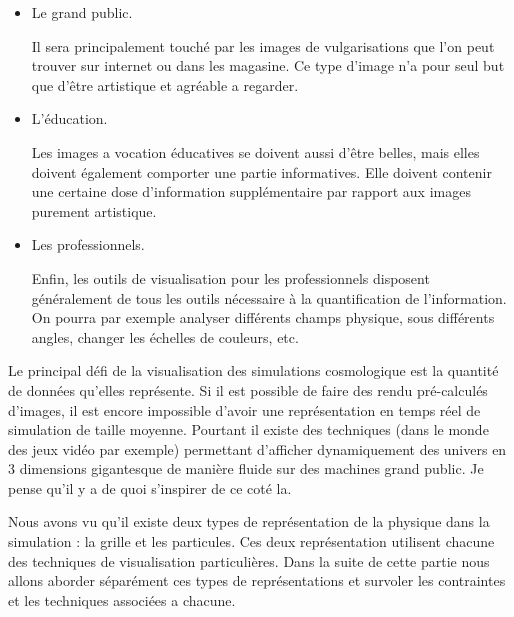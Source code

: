 \begin{itemize}
\item Le grand public. 
 
Il sera principalement touché par les images de vulgarisations que l'on peut trouver sur internet ou dans les magasine.
Ce type d'image n'a pour seul but que d'être artistique et agréable a regarder.

\item L'éducation.

Les images a vocation éducatives se doivent aussi d'être belles, mais elles doivent également comporter une partie informatives.
Elle doivent contenir une certaine dose d'information supplémentaire par rapport aux images purement artistique.

\item Les professionnels.

Enfin, les outils de visualisation pour les professionnels disposent généralement de tous les outils nécessaire à la quantification de l'information.
On pourra par exemple analyser différents champs physique, sous différents angles, changer les échelles de couleurs, etc.

\end{itemize}





Le principal défi de la visualisation des simulations cosmologique est la quantité de données qu'elles représente.
Si il est possible de faire des rendu pré-calculés d'images, il est encore impossible d'avoir une représentation en temps réel de simulation de taille moyenne.
Pourtant il existe des techniques (dans le monde des jeux vidéo par exemple) permettant d'afficher dynamiquement des univers en 3 dimensions gigantesque de manière fluide sur des machines grand public.
Je pense qu'il y a de quoi s'inspirer de ce coté la.

Nous avons vu %
qu'il existe deux types de représentation de la physique dans la simulation : la grille et les particules.
Ces deux représentation utilisent chacune des techniques de visualisation particulières.
Dans la suite de cette partie nous allons aborder séparément ces types de représentations et survoler les contraintes et les techniques associées a chacune.

